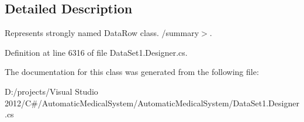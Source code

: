 \subsection{Detailed Description}
Represents strongly named DataRow class. /summary$>$. 

Definition at line 6316 of file DataSet1.Designer.cs.

The documentation for this class was generated from the following file:\begin{CompactItemize}
\item 
D:/projects/Visual Studio 2012/C\#/AutomaticMedicalSystem/AutomaticMedicalSystem/DataSet1.Designer.cs\end{CompactItemize}
